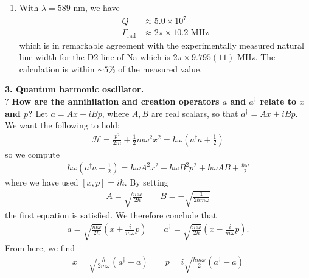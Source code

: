 \documentclass{article}
\theoremstyle{definition}
\newcommand{\ham}{\mathcal{H}}
\newcommand{\f}[2]{\frac{#1}{#2}}
\newcommand{\lp}{\left(}
\newcommand{\rp}{\right)}
\begin{document}
\begin{enumerate}[label=\alph*)]
	\item With $\lambda = 589 $ nm, we have
	\begin{align*}
	Q &\approx 5.0 \times 10^7 \\
	\Gamma_\text{rad} &\approx 2\pi \times 10.2 \text{ MHz}
	\end{align*}
	which is in remarkable agreement with the experimentally measured natural line width for the D2 line of Na which is $2\pi \times 9.795(11)$ MHz. The calculation is within $\sim 5$\% of the measured value.  
\end{enumerate}






\noindent \textbf{3. Quantum harmonic oscillator.} \\


\noindent $\boxed{\textbf{?}}$ \textbf{How are the annihilation and creation operators $ a$ and $ a^\dagger$ relate to $ x$ and $ p$?} Let $a = A  x - i B  p$, where $A,B$ are real scalars, so that $ a^\dagger = A x+ i B  p$. We want the following to hold:
\begin{align*}
\ham = \f{p^2 }{2m} + \f{1}{2}m\omega^2 x^2 = \hbar \omega \lp a^\dagger a + \f{1}{2} \rp
\end{align*}
so we compute
\begin{align*}
\hbar \omega \lp a^\dagger a+ \f{1}{2}\rp = \hbar \omega A^2 x^2 + \hbar \omega B^2 p^2 + \hbar \omega AB + \f{\hbar \omega}{2}
\end{align*}
where we have used $[x,p] = i\hbar $. By setting 
\begin{align*}
A = \sqrt{\f{m\omega}{2\hbar}} \quad\quad B = -\sqrt{\f{1}{2\hbar m\omega}}
\end{align*}
the first equation is satisfied. We therefore conclude that
\begin{align*}
a = \sqrt{\f{m\omega}{2\hbar}} \lp x + \f{i}{m\omega} p \rp \quad\quad a^\dagger = \sqrt{\f{m\omega}{2\hbar}} \lp x - \f{i}{m\omega} p \rp.
\end{align*}
From here, we find 
\begin{align*}
x = \sqrt{\f{\hbar}{2 m\omega}}(a^\dagger + a) \quad\quad p = i\sqrt{\f{\hbar m\omega }{2}}(a^\dagger - a)
\end{align*}
\end{document}
